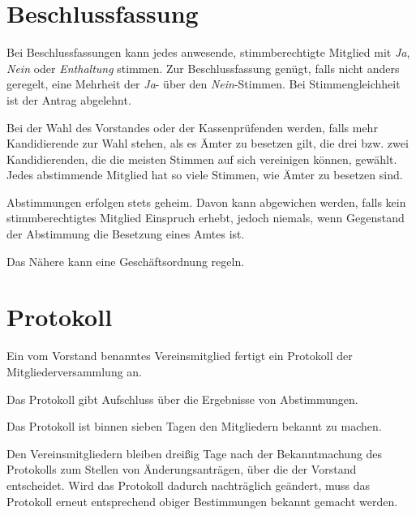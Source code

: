 \section{Beschlussfassung}
	\begin{myEnum}
		\item Bei Beschlussfassungen kann jedes anwesende, stimmberechtigte Mitglied mit \textit{Ja}, \textit{Nein} oder \textit{Enthaltung} stimmen. Zur Beschlussfassung genügt, falls nicht anders geregelt, eine Mehrheit der \textit{Ja}- über den \textit{Nein}-Stimmen. Bei Stimmengleichheit ist der Antrag abgelehnt.
		\item Bei der Wahl des Vorstandes oder der Kassenprüfenden werden, falls mehr Kandidierende zur Wahl stehen, als es Ämter zu besetzen gilt, die drei bzw. zwei Kandidierenden, die die meisten Stimmen auf sich vereinigen	können, gewählt. Jedes abstimmende Mitglied hat so viele Stimmen, wie Ämter zu besetzen sind.
		\item Abstimmungen erfolgen stets geheim. Davon kann abgewichen werden, falls kein stimmberechtigtes Mitglied Einspruch erhebt, jedoch niemals, wenn Gegenstand der Abstimmung die Besetzung eines Amtes ist.
		\item Das Nähere kann eine Geschäftsordnung regeln.
	\end{myEnum}

\section{Protokoll}
	\begin{myEnum}
		\item Ein vom Vorstand benanntes Vereinsmitglied fertigt ein Protokoll der Mitgliederversammlung an.
		\item Das Protokoll gibt Aufschluss über die Ergebnisse von Abstimmungen.
		\item Das Protokoll ist binnen sieben Tagen den Mitgliedern bekannt zu machen.
		\item Den  Vereinsmitgliedern  bleiben  dreißig  Tage  nach  der  Bekanntmachung  des  Protokolls  zum  Stellen  von Änderungsanträgen, über die der Vorstand entscheidet. Wird das Protokoll dadurch nachträglich geändert, muss das Protokoll erneut entsprechend obiger Bestimmungen bekannt gemacht werden.
	\end{myEnum}

